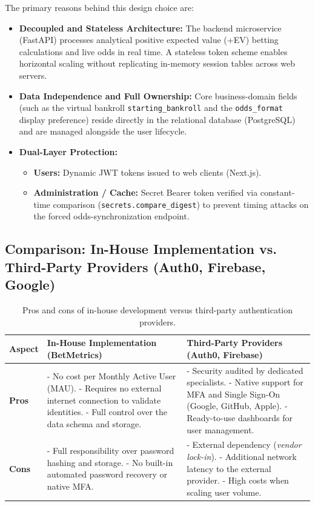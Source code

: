\documentclass[11pt,a4paper]{article}
\begin{document}
The primary reasons behind this design choice are:
\begin{itemize}
    \item \textbf{Decoupled and Stateless Architecture:} The backend microservice (FastAPI) processes analytical positive expected value (+EV) betting calculations and live odds in real time. A stateless token scheme enables horizontal scaling without replicating in-memory session tables across web servers.
    \item \textbf{Data Independence and Full Ownership:} Core business-domain fields (such as the virtual bankroll \texttt{starting\_bankroll} and the \texttt{odds\_format} display preference) reside directly in the relational database (PostgreSQL) and are managed alongside the user lifecycle.
    \item \textbf{Dual-Layer Protection:}
    \begin{itemize}
        \item \textbf{Users:} Dynamic JWT tokens issued to web clients (Next.js).
        \item \textbf{Administration / Cache:} Secret Bearer token verified via constant-time comparison (\texttt{secrets.compare\_digest}) to prevent timing attacks on the forced odds-synchronization endpoint.
    \end{itemize}
\end{itemize}

\subsection{Comparison: In-House Implementation vs. Third-Party Providers (Auth0, Firebase, Google)}

\begin{table}[h!]
\centering
\small
\begin{tabular}{p{3.2cm} p{5.5cm} p{5.5cm}}
\toprule
\textbf{Aspect} & \textbf{In-House Implementation (BetMetrics)} & \textbf{Third-Party Providers (Auth0, Firebase)} \\
\midrule
\textbf{Pros} & 
- No cost per Monthly Active User (MAU).\newline
- Requires no external internet connection to validate identities.\newline
- Full control over the data schema and storage. & 
- Security audited by dedicated specialists.\newline
- Native support for MFA and Single Sign-On (Google, GitHub, Apple).\newline
- Ready-to-use dashboards for user management. \\
\midrule
\textbf{Cons} & 
- Full responsibility over password hashing and storage.\newline
- No built-in automated password recovery or native MFA. & 
- External dependency (\textit{vendor lock-in}).\newline
- Additional network latency to the external provider.\newline
- High costs when scaling user volume. \\
\bottomrule
\end{tabular}
\caption{Pros and cons of in-house development versus third-party authentication providers.}
\end{table}
\end{document}
